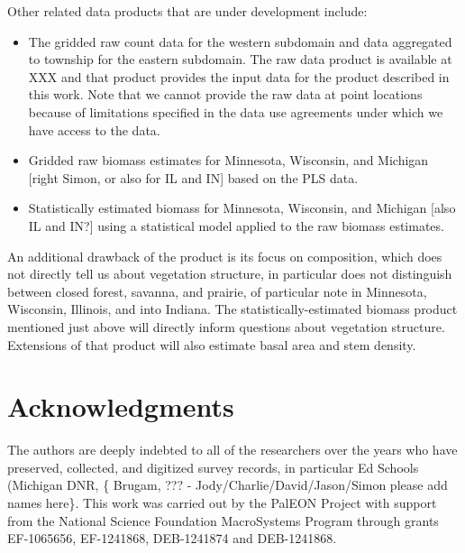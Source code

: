 \documentclass[12pt]{article}\usepackage[]{graphicx}\usepackage[]{color}
\begin{document}
Other related data products that are under development include:
\begin{itemize}
\item The gridded raw count data for the western subdomain and data aggregated
to township for the eastern subdomain. The raw data product is available
at XXX and that product provides the input data for the product described
in this work. Note that we cannot provide the raw data at point locations
because of limitations specified in the data use agreements under
which we have access to the data.
\item Gridded raw biomass estimates for Minnesota, Wisconsin, and Michigan
{[}right Simon, or also for IL and IN{]} based on the PLS data.
\item Statistically estimated biomass for Minnesota, Wisconsin, and Michigan
{[}also IL and IN?{]} using a statistical model applied to the raw
biomass estimates.
\end{itemize}
An additional drawback of the product is its focus on composition,
which does not directly tell us about vegetation structure, in particular
does not distinguish between closed forest, savanna, and prairie,
of particular note in Minnesota, Wisconsin, Illinois, and into Indiana.
The statistically-estimated biomass product mentioned just above will
directly inform questions about vegetation structure. Extensions of
that product will also estimate basal area and stem density. 


\section*{Acknowledgments}

The authors are deeply indebted to all of the researchers over the
years who have preserved, collected, and digitized survey records,
in particular Ed Schools (Michigan DNR, \{ Brugam, ??? - Jody/Charlie/David/Jason/Simon
please add names here\}. This work was carried out by the PalEON Project
with support from the National Science Foundation MacroSystems Program
through grants EF-1065656, EF-1241868, DEB-1241874 and DEB-1241868. 




\end{document}
